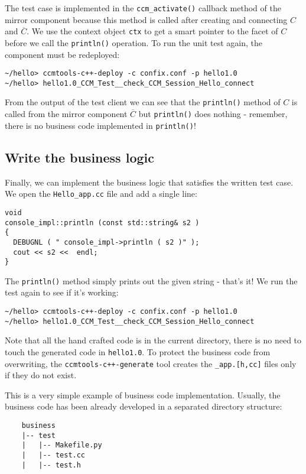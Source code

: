 \noindent
The test case is implemented in the {\tt ccm\_activate()} callback method of the mirror
component because this method is called after creating and connecting
$C$ and $\overline{C}$.  
We use the context object {\tt ctx} to get a smart pointer to the facet of $C$
before we call the {\tt println()} operation.
To run the unit test again, the component must be redeployed:
\begin{verbatim}
~/hello> ccmtools-c++-deploy -c confix.conf -p hello1.0
~/hello> hello1.0_CCM_Test__check_CCM_Session_Hello_connect
\end{verbatim}
From the output of the test client we can see that the {\tt println()} method
of $C$ is called from the mirror component $\overline{C}$ but {\tt println()}
does nothing - remember, there is no business code implemented in {\tt println()}!




\subsection{Write the business logic}

Finally, we can implement the business logic that satisfies the written test case.
We open the {\tt Hello\_app.cc} file and add a single line:
\begin{verbatim}
void
console_impl::println (const std::string& s2 )
{
  DEBUGNL ( " console_impl->println ( s2 )" );
  cout << s2 <<  endl;
}
\end{verbatim}

\noindent
The {\tt println()} method simply prints out the given string - that's it!
We run the test again to see if it's working:
\begin{verbatim}
~/hello> ccmtools-c++-deploy -c confix.conf -p hello1.0
~/hello> hello1.0_CCM_Test__check_CCM_Session_Hello_connect
\end{verbatim}

Note that all the hand crafted code is in the current directory, there is no
need to touch the generated code in {\tt hello1.0}.
To protect the business code from overwriting, the {\tt ccmtools-c++-generate} 
tool creates the {\tt *\_app.[h,cc]} files only if they do not exist. 


This is a very simple example of business code implementation.
Usually, the business code has been already developed in a separated directory 
structure:
\begin{verbatim}
    business
    |-- test
    |   |-- Makefile.py
    |   |-- test.cc
    |   |-- test.h
\end{verbatim}

